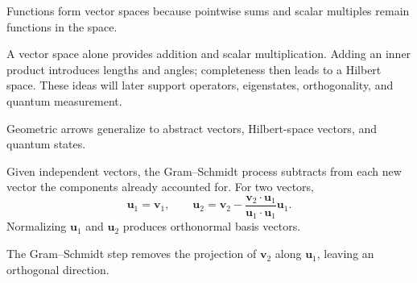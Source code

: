 \begin{bookfigure}{Functions form vector spaces because pointwise sums and scalar multiples remain functions in the space.}

\label{fig:function-vector-space}
\end{bookfigure}


A vector space alone provides addition and scalar multiplication. Adding an inner product introduces lengths and angles; completeness then leads to a Hilbert space. These ideas will later support operators, eigenstates, orthogonality, and quantum measurement.

\begin{bookfigure}{Geometric arrows generalize to abstract vectors, Hilbert-space vectors, and quantum states.}

\label{fig:hilbert-space-bridge}
\end{bookfigure}

Given independent vectors, the Gram--Schmidt process subtracts from each new vector the components already accounted for. For two vectors,
\[
\mathbf u_1=\mathbf v_1,\qquad
\mathbf u_2=\mathbf v_2-
\frac{\mathbf v_2\cdot\mathbf u_1}{\mathbf u_1\cdot\mathbf u_1}\mathbf u_1.
\]
Normalizing $\mathbf u_1$ and $\mathbf u_2$ produces orthonormal basis vectors.

\begin{bookfigure}{The Gram--Schmidt step removes the projection of $\mathbf v_2$ along $\mathbf u_1$, leaving an orthogonal direction.}

\end{bookfigure}

